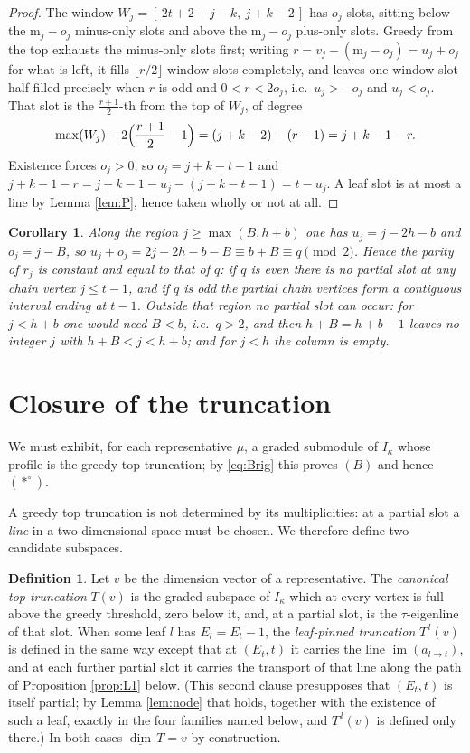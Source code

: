 \documentclass[reqno]{amsart}
\theoremstyle{plain}
\newtheorem{corollary}[theorem]{Corollary}
\theoremstyle{definition}
\newtheorem{definition}[theorem]{Definition}
\DeclareMathOperator{\im}{im}
\newcommand{\dimv}{\underline{\dim}\,}
\newcommand{\ka}{\kappa}
\newcommand{\ms}{\mathrm{m}}
\begin{document}
\begin{proof}
The window $W_j=[\,2t+2-j-k,\ j+k-2\,]$ has $o_j$ slots, sitting below the
$\ms_j-o_j$ minus-only slots and above the $\ms_j-o_j$ plus-only slots.  Greedy
from the top exhausts the minus-only slots first; writing
$r=v_j-(\ms_j-o_j)=u_j+o_j$ for what is left, it fills $\lfloor r/2\rfloor$
window slots completely, and leaves one window slot half filled precisely when
$r$ is odd and $0<r<2o_j$, i.e.\ $u_j>-o_j$ and $u_j<o_j$.  That slot is the
$\frac{r+1}{2}$-th from the top of $W_j$, of degree
\[
   \max(W_j)-2\Bigl(\frac{r+1}{2}-1\Bigr)=(j+k-2)-(r-1)=j+k-1-r .
\]
Existence forces $o_j>0$, so $o_j=j+k-t-1$ and $j+k-1-r=j+k-1-u_j-(j+k-t-1)
=t-u_j$.  A leaf slot is at most a line by Lemma \ref{lem:P}, hence taken
wholly or not at all.
\end{proof}

\begin{corollary}\label{cor:parity}
Along the region $j\ge\max(B,h+b)$ one has $u_j=j-2h-b$ and $o_j=j-B$, so
$u_j+o_j=2j-2h-b-B\equiv b+B\equiv q\pmod2$.  Hence the parity of $r_j$ is
constant and equal to that of $q$: if $q$ is even there is no partial slot at
any chain vertex $j\le t-1$, and if $q$ is odd the partial chain vertices form
a contiguous interval ending at $t-1$.  Outside that region no partial slot can
occur: for $j<h+b$ one would need $B<b$, i.e.\ $q>2$, and then
$h+B=h+b-1$ leaves no integer $j$ with $h+B<j<h+b$; and for $j<h$ the column is
empty.
\end{corollary}

\section{Closure of the truncation}\label{sec:closure}

We must exhibit, for each representative $\mu$, a graded submodule of $I_\ka$
whose profile is the greedy top truncation; by \eqref{eq:Brig} this proves
$(B)$ and hence $(*^\circ)$.

A greedy top truncation is not determined by its multiplicities: at a partial
slot a \emph{line} in a two-dimensional space must be chosen.  We therefore
define two candidate subspaces.

\begin{definition}\label{def:Tv}
Let $v$ be the dimension vector of a representative.  The \emph{canonical top
truncation} $T(v)$ is the graded subspace of $I_\ka$ which at every vertex is
full above the greedy threshold, zero below it, and, at a partial slot, is the
$\tau$-eigenline of that slot.  When some leaf $l$ has $E_l=E_t-1$, the
\emph{leaf-pinned truncation} $T^{\,l}(v)$ is defined in the same way except
that at $(E_t,t)$ it carries the line $\im(a_{l\to t})$, and at each further
partial slot it carries the transport of that line along the path of
Proposition \ref{prop:L1} below.  (This second clause presupposes that
$(E_t,t)$ is itself partial; by Lemma \ref{lem:node} that holds, together with
the existence of such a leaf, exactly in the four families named below, and
$T^{\,l}(v)$ is defined only there.)  In both cases $\dimv T=v$ by
construction.
\end{definition}
\end{document}
